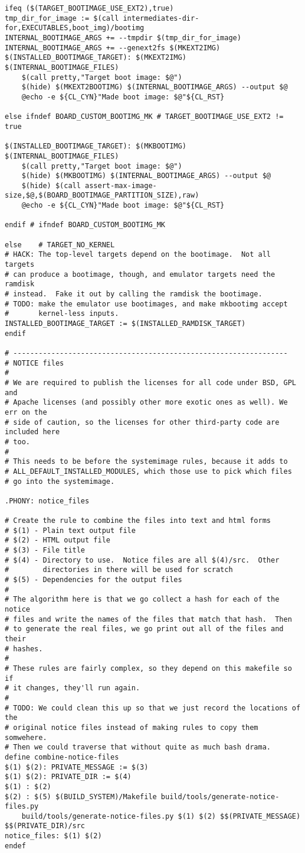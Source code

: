 \documentclass[12pt,a4paper]{article}
\begin{document}
\begin{verbatim}
ifeq ($(TARGET_BOOTIMAGE_USE_EXT2),true)
tmp_dir_for_image := $(call intermediates-dir-for,EXECUTABLES,boot_img)/bootimg
INTERNAL_BOOTIMAGE_ARGS += --tmpdir $(tmp_dir_for_image)
INTERNAL_BOOTIMAGE_ARGS += --genext2fs $(MKEXT2IMG)
$(INSTALLED_BOOTIMAGE_TARGET): $(MKEXT2IMG) $(INTERNAL_BOOTIMAGE_FILES)
	$(call pretty,"Target boot image: $@")
	$(hide) $(MKEXT2BOOTIMG) $(INTERNAL_BOOTIMAGE_ARGS) --output $@
	@echo -e ${CL_CYN}"Made boot image: $@"${CL_RST}

else ifndef BOARD_CUSTOM_BOOTIMG_MK # TARGET_BOOTIMAGE_USE_EXT2 != true

$(INSTALLED_BOOTIMAGE_TARGET): $(MKBOOTIMG) $(INTERNAL_BOOTIMAGE_FILES)
	$(call pretty,"Target boot image: $@")
	$(hide) $(MKBOOTIMG) $(INTERNAL_BOOTIMAGE_ARGS) --output $@
	$(hide) $(call assert-max-image-size,$@,$(BOARD_BOOTIMAGE_PARTITION_SIZE),raw)
	@echo -e ${CL_CYN}"Made boot image: $@"${CL_RST}

endif # ifndef BOARD_CUSTOM_BOOTIMG_MK

else	# TARGET_NO_KERNEL
# HACK: The top-level targets depend on the bootimage.  Not all targets
# can produce a bootimage, though, and emulator targets need the ramdisk
# instead.  Fake it out by calling the ramdisk the bootimage.
# TODO: make the emulator use bootimages, and make mkbootimg accept
#       kernel-less inputs.
INSTALLED_BOOTIMAGE_TARGET := $(INSTALLED_RAMDISK_TARGET)
endif

# -----------------------------------------------------------------
# NOTICE files
#
# We are required to publish the licenses for all code under BSD, GPL and
# Apache licenses (and possibly other more exotic ones as well). We err on the
# side of caution, so the licenses for other third-party code are included here
# too.
#
# This needs to be before the systemimage rules, because it adds to
# ALL_DEFAULT_INSTALLED_MODULES, which those use to pick which files
# go into the systemimage.

.PHONY: notice_files

# Create the rule to combine the files into text and html forms
# $(1) - Plain text output file
# $(2) - HTML output file
# $(3) - File title
# $(4) - Directory to use.  Notice files are all $(4)/src.  Other
#		 directories in there will be used for scratch
# $(5) - Dependencies for the output files
#
# The algorithm here is that we go collect a hash for each of the notice
# files and write the names of the files that match that hash.  Then
# to generate the real files, we go print out all of the files and their
# hashes.
#
# These rules are fairly complex, so they depend on this makefile so if
# it changes, they'll run again.
#
# TODO: We could clean this up so that we just record the locations of the
# original notice files instead of making rules to copy them somwehere.
# Then we could traverse that without quite as much bash drama.
define combine-notice-files
$(1) $(2): PRIVATE_MESSAGE := $(3)
$(1) $(2): PRIVATE_DIR := $(4)
$(1) : $(2)
$(2) : $(5) $(BUILD_SYSTEM)/Makefile build/tools/generate-notice-files.py
	build/tools/generate-notice-files.py $(1) $(2) $$(PRIVATE_MESSAGE) $$(PRIVATE_DIR)/src
notice_files: $(1) $(2)
endef


\end{verbatim}
\end{document}
